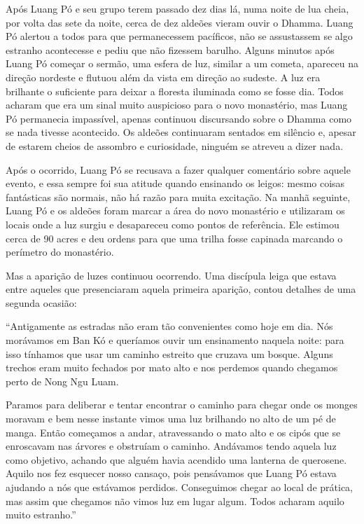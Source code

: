 Após Luang Pó e seu grupo terem passado dez dias lá, numa noite de lua
cheia, por volta das sete da noite, cerca de dez aldeões vieram ouvir o
Dhamma. Luang Pó alertou a todos para que permanecessem pacíficos, não
se assustassem se algo estranho acontecesse e pediu que não fizessem
barulho. Alguns minutos após Luang Pó começar o sermão, uma esfera de
luz, similar a um cometa, apareceu na direção nordeste e flutuou além da
vista em direção ao sudeste. A luz era brilhante o suficiente para
deixar a floresta iluminada como se fosse dia. Todos acharam que era um
sinal muito auspicioso para o novo monastério, mas Luang Pó permanecia
impassível, apenas continuou discursando sobre o Dhamma como se nada
tivesse acontecido. Os aldeões continuaram sentados em silêncio e,
apesar de estarem cheios de assombro e curiosidade, ninguém se atreveu a
dizer nada.

Após o ocorrido, Luang Pó se recusava a fazer qualquer comentário sobre
aquele evento, e essa sempre foi sua atitude quando ensinando os leigos:
mesmo coisas fantásticas são normais, não há razão para muita excitação.
Na manhã seguinte, Luang Pó e os aldeões foram marcar a área do novo
monastério e utilizaram os locais onde a luz surgiu e desapareceu como
pontos de referência. Ele estimou cerca de 90 acres e deu ordens para
que uma trilha fosse capinada marcando o perímetro do monastério.

Mas a aparição de luzes continuou ocorrendo. Uma discípula leiga que
estava entre aqueles que presenciaram aquela primeira aparição, contou
detalhes de uma segunda ocasião:

``Antigamente as estradas não eram tão convenientes como hoje em dia.
Nós morávamos em Ban Kó e queríamos ouvir um ensinamento naquela noite:
para isso tínhamos que usar um caminho estreito que cruzava um bosque.
Alguns trechos eram muito fechados por mato alto e nos perdemos quando
chegamos perto de Nong Ngu Luam.

Paramos para deliberar e tentar encontrar o caminho para chegar onde os
monges moravam e bem nesse instante vimos uma luz brilhando no alto de
um pé de manga. Então começamos a andar, atravessando o mato alto e os
cipós que se enroscavam nas árvores e obstruíam o caminho. Andávamos
tendo aquela luz como objetivo, achando que alguém havia acendido uma
lanterna de querosene. Aquilo nos fez esquecer nosso cansaço, pois
pensávamos que Luang Pó estava ajudando a nós que estávamos perdidos.
Conseguimos chegar ao local de prática, mas assim que chegamos não vimos
luz em lugar algum. Todos acharam aquilo muito estranho.''

